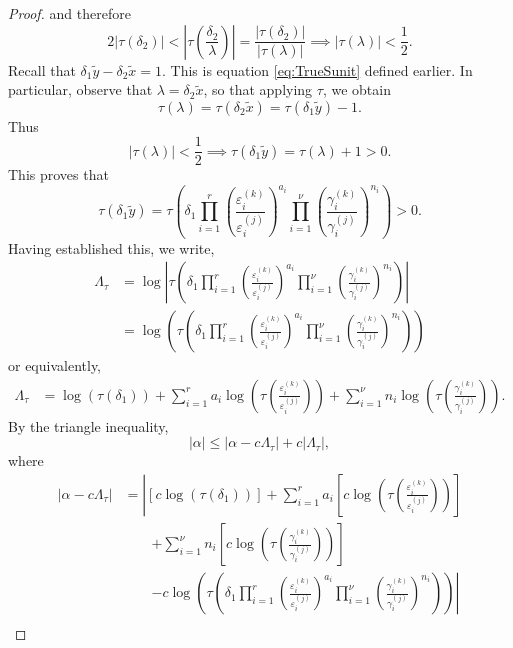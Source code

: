 \begin{proof}
and therefore
\[2|\tau(\delta_2)| < \left|\tau\left(\frac{\delta_2}{\lambda}\right)\right| = \frac{|\tau(\delta_2)|}{|\tau(\lambda)|} \implies |\tau(\lambda)| < \frac{1}{2}.\]
Recall that $\delta_1\tilde{y} - \delta_2\tilde{x} = 1$. This is equation \eqref{eq:TrueSunit} defined earlier. In particular, observe that $\lambda = \delta_2\tilde{x}$, so that applying $\tau$, we obtain
\[\tau(\lambda) = \tau(\delta_2\tilde{x}) = \tau(\delta_1\tilde{y}) - 1.\]
Thus
\[|\tau(\lambda)| < \frac{1}{2} \implies \tau(\delta_1\tilde{y}) = \tau(\lambda) + 1 > 0.\]
This proves that
\[\tau(\delta_1\tilde{y}) = \tau\left(\delta_1 \prod_{i = 1}^r\left( \frac{\varepsilon_i^{(k)}}{\varepsilon_i^{(j)}}\right)^{a_i}\prod_{i = 1}^{\nu} \left( \frac{\gamma_i^{(k)}}{\gamma_i^{(j)}}\right)^{n_i}\right) > 0.\]
Having established this, we write, 
\begin{align*}
\Lambda_{\tau} &= \log\left|\tau\left(\delta_1 \prod_{i = 1}^r\left( \frac{\varepsilon_i^{(k)}}{\varepsilon_i^{(j)}}\right)^{a_i}\prod_{i = 1}^{\nu} \left( \frac{\gamma_i^{(k)}}{\gamma_i^{(j)}}\right)^{n_i}\right)\right|\\
&= \log\left(\tau\left(\delta_1 \prod_{i = 1}^r\left( \frac{\varepsilon_i^{(k)}}{\varepsilon_i^{(j)}}\right)^{a_i}\prod_{i = 1}^{\nu} \left( \frac{\gamma_i^{(k)}}{\gamma_i^{(j)}}\right)^{n_i}\right)\right)
\end{align*}
or equivalently, 
\begin{align*}
\Lambda_{\tau}	
	& = \log\left(\tau\left(\delta_1\right)\right) + \sum_{i=1}^r a_i\log\left(\tau\left( \frac{\varepsilon_i^{(k)}}{\varepsilon_i^{(j)}}\right) \right) + \sum_{i=1}^{\nu}n_i\log \left(\tau\left( \frac{\gamma_i^{(k)}}{\gamma_i^{(j)}}\right)\right).
\end{align*}
By the triangle inequality, 
\[|\alpha| \leq |\alpha - c\Lambda_{\tau}| + c|\Lambda_{\tau}|,\]
where
\begin{align*}
|\alpha-c\Lambda_\tau|
	& = \left|[c\log(\tau(\delta_1))] +\sum_{i = 1}^r a_i \left[c\log\left(\tau\left(\frac{\varepsilon_i^{(k)}}{\varepsilon_i^{(j)}}\right)\right)\right] \right.\\
	& \quad \quad \left. + \sum_{i = 1}^{\nu} n_i \left[c\log\left(\tau\left(\frac{\gamma_i^{(k)}}{\gamma_i^{(j)}}\right)\right)\right] \right. \\
	&\quad\quad \left.- c \log\left(\tau\left(\delta_1 \prod_{i = 1}^r\left( \frac{\varepsilon_i^{(k)}}{\varepsilon_i^{(j)}}\right)^{a_i}\prod_{i = 1}^{\nu} \left( \frac{\gamma_i^{(k)}}{\gamma_i^{(j)}}\right)^{n_i}\right)\right)\right|\\

\end{align*}
\end{proof}
